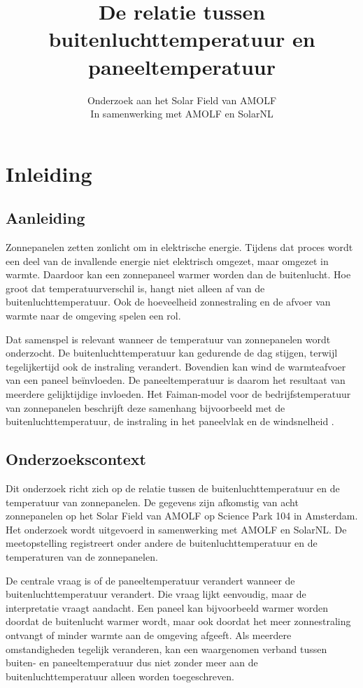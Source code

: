\documentclass[12pt,a4paper]{article}
\title{De relatie tussen buitenluchttemperatuur en paneeltemperatuur}
\author{Onderzoek aan het Solar Field van AMOLF \\ In samenwerking met AMOLF en SolarNL}
\date{}
\begin{document}
\maketitle

\section{Inleiding}

\subsection{Aanleiding}

Zonnepanelen zetten zonlicht om in elektrische energie. Tijdens dat proces wordt een deel van de invallende energie niet elektrisch omgezet, maar omgezet in warmte. Daardoor kan een zonnepaneel warmer worden dan de buitenlucht. Hoe groot dat temperatuurverschil is, hangt niet alleen af van de buitenluchttemperatuur. Ook de hoeveelheid zonnestraling en de afvoer van warmte naar de omgeving spelen een rol.

Dat samenspel is relevant wanneer de temperatuur van zonnepanelen wordt onderzocht. De buitenluchttemperatuur kan gedurende de dag stijgen, terwijl tegelijkertijd ook de instraling verandert. Bovendien kan wind de warmteafvoer van een paneel beïnvloeden. De paneeltemperatuur is daarom het resultaat van meerdere gelijktijdige invloeden. Het Faiman-model voor de bedrijfstemperatuur van zonnepanelen beschrijft deze samenhang bijvoorbeeld met de buitenluchttemperatuur, de instraling in het paneelvlak en de windsnelheid \cite{faiman2008outdoor}.

\subsection{Onderzoekscontext}

Dit onderzoek richt zich op de relatie tussen de buitenluchttemperatuur en de temperatuur van zonnepanelen. De gegevens zijn afkomstig van acht zonnepanelen op het Solar Field van AMOLF op Science Park 104 in Amsterdam. Het onderzoek wordt uitgevoerd in samenwerking met AMOLF en SolarNL. De meetopstelling registreert onder andere de buitenluchttemperatuur en de temperaturen van de zonnepanelen.

De centrale vraag is of de paneeltemperatuur verandert wanneer de buitenluchttemperatuur verandert. Die vraag lijkt eenvoudig, maar de interpretatie vraagt aandacht. Een paneel kan bijvoorbeeld warmer worden doordat de buitenlucht warmer wordt, maar ook doordat het meer zonnestraling ontvangt of minder warmte aan de omgeving afgeeft. Als meerdere omstandigheden tegelijk veranderen, kan een waargenomen verband tussen buiten- en paneeltemperatuur dus niet zonder meer aan de buitenluchttemperatuur alleen worden toegeschreven.
\end{document}
